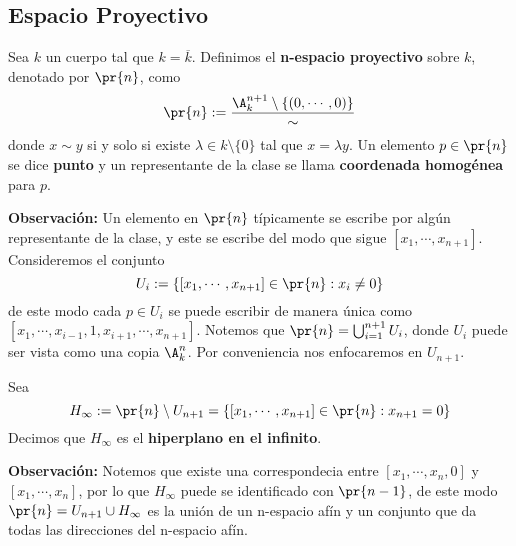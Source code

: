 \documentclass{article}
\begin{document}
\subsection{Espacio Proyectivo}
\begin{dfn}
    Sea $k$ un cuerpo tal que $k=\overline{k}$. Definimos el \textbf{n-espacio proyectivo} sobre 
    $k$, denotado por $\pr{n}$, como
    \begin{equation*}
        \pr{n}:=\frac{\A_{k}^{n+1}\setminus\{(0,\cdots,0)\}}{\sim}
    \end{equation*}
    donde $x\sim y$ si y solo si existe $\lambda\in k\setminus\{0\}$ tal que $x=\lambda y$. Un
    elemento $p\in\pr{n}$ se dice \textbf{punto} y un representante de la clase se llama 
    \textbf{coordenada homogénea} para $p$.
\end{dfn}
\noindent\textbf{Observación:} Un elemento en $\pr{n}$ típicamente se escribe por algún 
representante de la clase, y este se escribe del modo que sigue $[x_{1},\cdots,x_{n+1}]$. 
Consideremos el conjunto
\begin{equation*}
    U_{i}:=\left\{[x_{1},\cdots,x_{n+1}]\in\pr{n}:x_{i}\neq0\right\}
\end{equation*}
de este modo cada $p\in U_{i}$ se puede escribir de manera única como 
$[x_{1},\cdots,x_{i-1},1,x_{i+1},\cdots,x_{n+1}]$. Notemos que $\pr{n}=\bigcup_{i=1}^{n+1}U_{i}$, 
donde $U_{i}$ puede ser vista como una copia $\A_{k}^{n}$. Por conveniencia nos enfocaremos en
$U_{n+1}$.
\begin{dfn}
    Sea
    \begin{equation*}
        H_{\infty}:=\pr{n}\setminus U_{n+1}=\left\{[x_{1},\cdots,x_{n+1}]\in\pr{n}:x_{n+1}=0
        \right\}
    \end{equation*}
    Decimos que $H_{\infty}$ es el \textbf{hiperplano en el infinito}.
\end{dfn}
\noindent\textbf{Observación:} Notemos que existe una correspondecia entre $[x_{1},\cdots,x_{n},0]$
y $[x_{1},\cdots,x_{n}]$, por lo que $H_{\infty}$ puede se identificado con $\pr{n-1}$, de este 
modo $\pr{n}=U_{n+1}\cup H_{\infty}$ es la unión de un n-espacio afín y un conjunto que da todas 
las direcciones del n-espacio afín.
\end{document}
